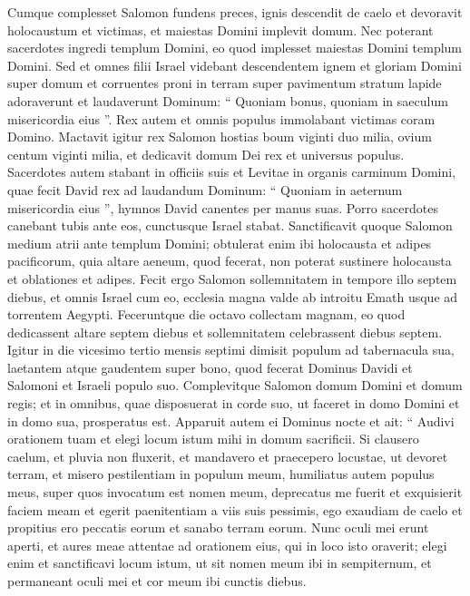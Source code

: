 \begin{biblechapter}
\begin{biblechapter}
\begin{biblechapter}
\begin{biblechapter}
\begin{biblechapter}
\begin{biblechapter}
\begin{biblechapter}
\verse Cumque complesset Salomon fundens preces, ignis descendit de caelo et devoravit holocaustum et victimas, et maiestas Domini implevit domum. 
\verse Nec poterant sacerdotes ingredi templum Domini, eo quod implesset maiestas Domini templum Domini. 
\verse Sed et omnes filii Israel videbant descendentem ignem et gloriam Domini super domum et corruentes proni in terram super pavimentum stratum lapide adoraverunt et laudaverunt Dominum: “ Quoniam bonus, quoniam in saeculum misericordia eius ”.
 \verse Rex autem et omnis populus immolabant victimas coram Domino. 
\verse Mactavit igitur rex Salomon hostias boum viginti duo milia, ovium centum viginti milia, et dedicavit domum Dei rex et universus populus. 
\verse Sacerdotes autem stabant in officiis suis et Levitae in organis carminum Domini, quae fecit David rex ad laudandum Dominum: “ Quoniam in aeternum misericordia eius ”, hymnos David canentes per manus suas. Porro sacerdotes canebant tubis ante eos, cunctusque Israel stabat.
 \verse Sanctificavit quoque Salomon medium atrii ante templum Domini; obtulerat enim ibi holocausta et adipes pacificorum, quia altare aeneum, quod fecerat, non poterat sustinere holocausta et oblationes et adipes.
 \verse Fecit ergo Salomon sollemnitatem in tempore illo septem diebus, et omnis Israel cum eo, ecclesia magna valde ab introitu Emath usque ad torrentem Aegypti. 
\verse Feceruntque die octavo collectam magnam, eo quod dedicassent altare septem diebus et sollemnitatem celebrassent diebus septem. 
\verse Igitur in die vicesimo tertio mensis septimi dimisit populum ad tabernacula sua, laetantem atque gaudentem super bono, quod fecerat Dominus Davidi et Salomoni et Israeli populo suo.
 \verse Complevitque Salomon domum Domini et domum regis; et in omnibus, quae disposuerat in corde suo, ut faceret in domo Domini et in domo sua, prosperatus est. 
\verse Apparuit autem ei Dominus nocte et ait: “ Audivi orationem tuam et elegi locum istum mihi in domum sacrificii. 
\verse Si clausero caelum, et pluvia non fluxerit, et mandavero et praecepero locustae, ut devoret terram, et misero pestilentiam in populum meum, 
\verse humiliatus autem populus meus, super quos invocatum est nomen meum, deprecatus me fuerit et exquisierit faciem meam et egerit paenitentiam a viis suis pessimis, ego exaudiam de caelo et propitius ero peccatis eorum et sanabo terram eorum. 
\verse Nunc oculi mei erunt aperti, et aures meae attentae ad orationem eius, qui in loco isto oraverit; 
\verse elegi enim et sanctificavi locum istum, ut sit nomen meum ibi in sempiternum, et permaneant oculi mei et cor meum ibi cunctis diebus.

\end{biblechapter}
\end{biblechapter}
\end{biblechapter}
\end{biblechapter}
\end{biblechapter}
\end{biblechapter}
\end{biblechapter}

